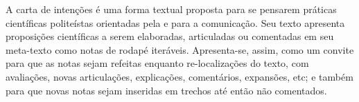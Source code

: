 A carta de intenções é uma forma textual proposta para se pensarem práticas científicas politeístas orientadas pela e para a comunicação. Seu texto apresenta proposições científicas a serem elaboradas, articuladas ou comentadas em seu meta-texto como notas de rodapé iteráveis. Apresenta-se, assim, como um convite para que as notas sejam refeitas enquanto re-localizações do texto, com avaliações, novas articulações, explicações, comentários, expansões, etc; e também para que novas notas sejam inseridas em trechos até então não comentados.